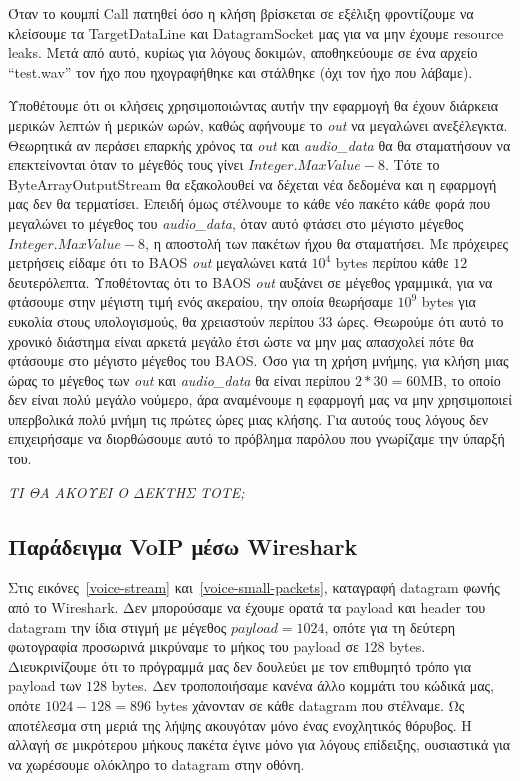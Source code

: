 \documentclass{article}
\begin{document}
Όταν το κουμπί Call πατηθεί όσο η κλήση βρίσκεται σε εξέλιξη φροντίζουμε να κλείσουμε τα TargetDataLine
και DatagramSocket μας για να μην έχουμε resource leaks. Μετά από αυτό, κυρίως για λόγους δοκιμών, 
αποθηκεύουμε σε ένα αρχείο ``test.wav'' τον ήχο που ηχογραφήθηκε και στάλθηκε (όχι τον ήχο που λάβαμε).

Υποθέτουμε ότι οι κλήσεις χρησιμοποιώντας 
αυτήν την εφαρμογή θα έχουν διάρκεια μερικών λεπτών ή μερικών ωρών, καθώς αφήνουμε το \textit{out} να μεγαλώνει 
ανεξέλεγκτα. Θεωρητικά αν περάσει επαρκής χρόνος τα \textit{out} και \textit{audio\_data} θα 
θα σταματήσουν να επεκτείνονται όταν το μέγεθός τους γίνει $Integer.MaxValue - 8$. Τότε το ByteArrayOutputStream θα 
εξακολουθεί να δέχεται νέα δεδομένα και η εφαρμογή μας δεν θα τερματίσει. Επειδή όμως
στέλνουμε το κάθε νέο πακέτο κάθε φορά που μεγαλώνει το μέγεθος του \textit{audio\_data}, όταν αυτό φτάσει 
στο μέγιστο μέγεθος $Integer.MaxValue - 8$, η αποστολή των πακέτων ήχου θα σταματήσει. Με πρόχειρες 
μετρήσεις είδαμε ότι το BAOS \textit{out} μεγαλώνει κατά $10^4$ bytes περίπου κάθε $12$ δευτερόλεπτα. 
Υποθέτοντας ότι το BAOS \textit{out} αυξάνει σε μέγεθος γραμμικά, για να φτάσουμε στην μέγιστη τιμή ενός ακεραίου, 
την οποία θεωρήσαμε $10^9$ bytes για ευκολία στους υπολογισμούς, θα χρειαστούν περίπου $33$ ώρες. Θεωρούμε
ότι αυτό το χρονικό διάστημα είναι αρκετά μεγάλο έτσι ώστε να μην μας απασχολεί πότε θα φτάσουμε στο μέγιστο 
μέγεθος του BAOS. Όσο για τη χρήση μνήμης,
για κλήση μιας ώρας το μέγεθος των \textit{out} και \textit{audio\_data} θα είναι περίπου $2 * 30 = 60$MB,
το οποίο δεν είναι πολύ μεγάλο νούμερο, άρα αναμένουμε η εφαρμογή μας να μην χρησιμοποιεί υπερβολικά πολύ
μνήμη τις πρώτες ώρες μιας κλήσης. Για αυτούς τους λόγους δεν επιχειρήσαμε να διορθώσουμε αυτό το πρόβλημα
παρόλου που γνωρίζαμε την ύπαρξή του.


\emph{ΤΙ ΘΑ ΑΚΟΥΕΙ Ο ΔΕΚΤΗΣ ΤΟΤΕ;}

\subsection{Παράδειγμα VoIP μέσω Wireshark}
Στις εικόνες~\ref{voice-stream} και~\ref{voice-small-packets}, καταγραφή datagram φωνής από το Wireshark.
Δεν μπορούσαμε να έχουμε ορατά τα payload και header του datagram την ίδια στιγμή με μέγεθος $payload = 1024$,
οπότε για τη δεύτερη φωτογραφία προσωρινά μικρύναμε το μήκος του payload σε $128$ bytes. Διευκρινίζουμε ότι το 
πρόγραμμά μας δεν δουλεύει με τον επιθυμητό τρόπο για payload των $128$ bytes. Δεν τροποποιήσαμε κανένα
άλλο κομμάτι του κώδικά μας, οπότε $1024 - 128 = 896$ bytes χάνονταν σε κάθε datagram που στέλναμε.
Ως αποτέλεσμα στη μεριά της λήψης ακουγόταν μόνο ένας ενοχλητικός θόρυβος. Η αλλαγή σε μικρότερου μήκους πακέτα 
έγινε μόνο για λόγους επίδειξης, ουσιαστικά για να χωρέσουμε ολόκληρο το datagram στην οθόνη.
\end{document}

